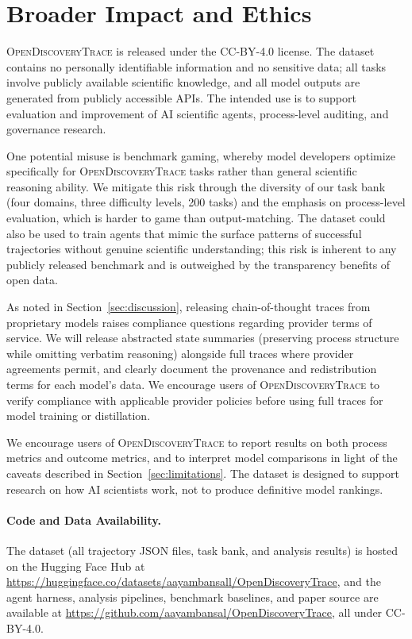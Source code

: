 \documentclass{article}
\newcommand{\dataset}{\textsc{OpenDiscoveryTrace}\xspace}
\begin{document}
\section{Broader Impact and Ethics}
\label{sec:ethics}

\dataset is released under the CC-BY-4.0 license. The dataset contains no personally identifiable information and no sensitive data; all tasks involve publicly available scientific knowledge, and all model outputs are generated from publicly accessible APIs. The intended use is to support evaluation and improvement of AI scientific agents, process-level auditing, and governance research.

One potential misuse is benchmark gaming, whereby model developers optimize specifically for \dataset tasks rather than general scientific reasoning ability. We mitigate this risk through the diversity of our task bank (four domains, three difficulty levels, 200 tasks) and the emphasis on process-level evaluation, which is harder to game than output-matching. The dataset could also be used to train agents that mimic the surface patterns of successful trajectories without genuine scientific understanding; this risk is inherent to any publicly released benchmark and is outweighed by the transparency benefits of open data.

As noted in Section~\ref{sec:discussion}, releasing chain-of-thought traces from proprietary models raises compliance questions regarding provider terms of service. We will release abstracted state summaries (preserving process structure while omitting verbatim reasoning) alongside full traces where provider agreements permit, and clearly document the provenance and redistribution terms for each model's data. We encourage users of \dataset to verify compliance with applicable provider policies before using full traces for model training or distillation.

We encourage users of \dataset to report results on both process metrics and outcome metrics, and to interpret model comparisons in light of the caveats described in Section~\ref{sec:limitations}. The dataset is designed to support research on how AI scientists work, not to produce definitive model rankings.

\paragraph{Code and Data Availability.}
The dataset (all trajectory JSON files, task bank, and analysis results) is hosted on the Hugging Face Hub at \url{https://huggingface.co/datasets/aayambansall/OpenDiscoveryTrace}, and the agent harness, analysis pipelines, benchmark baselines, and paper source are available at \url{https://github.com/aayambansal/OpenDiscoveryTrace}, all under CC-BY-4.0.
\end{document}

